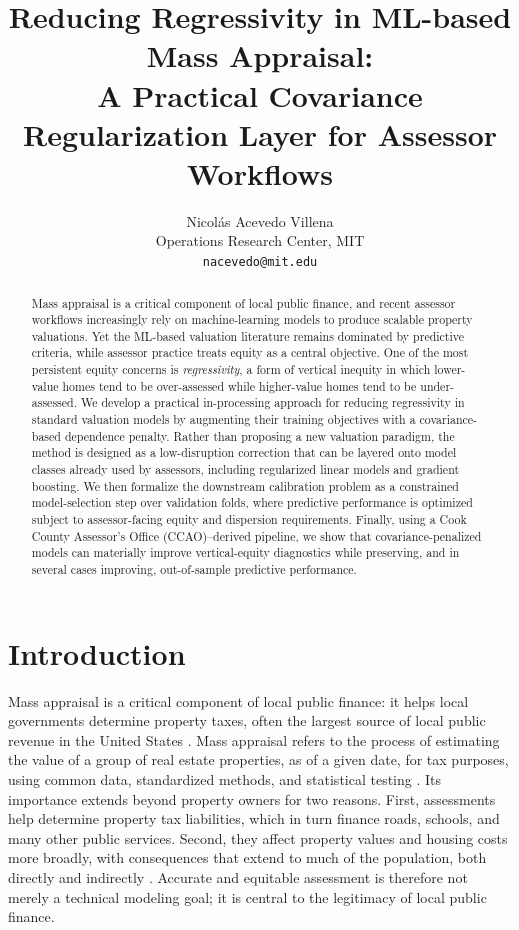\documentclass[12pt]{article}
\title{\vspace{-4mm}Reducing Regressivity in ML-based Mass Appraisal:\\
A Practical Covariance Regularization Layer for Assessor Workflows\vspace{-1mm}}
\author{
Nicol\'as Acevedo Villena\\
{\small Operations Research Center, MIT}\\
{\small \texttt{nacevedo@mit.edu}}
}
\date{\vspace{-8mm}}
\theoremstyle{plain}
\theoremstyle{definition}
\begin{document}
\maketitle

\begin{abstract}
Mass appraisal is a critical component of local public finance, and recent assessor workflows increasingly rely on machine-learning models to produce scalable property valuations. Yet the ML-based valuation literature remains dominated by predictive criteria, while assessor practice treats equity as a central objective. One of the most persistent equity concerns is \emph{regressivity}, a form of vertical inequity in which lower-value homes tend to be over-assessed while higher-value homes tend to be under-assessed. We develop a practical in-processing approach for reducing regressivity in standard valuation models by augmenting their training objectives with a covariance-based dependence penalty. Rather than proposing a new valuation paradigm, the method is designed as a low-disruption correction that can be layered onto model classes already used by assessors, including regularized linear models and gradient boosting. We then formalize the downstream calibration problem as a constrained model-selection step over validation folds, where predictive performance is optimized subject to assessor-facing equity and dispersion requirements. Finally, using a Cook County Assessor's Office (CCAO)--derived pipeline, we show that covariance-penalized models can materially improve vertical-equity diagnostics while preserving, and in several cases improving, out-of-sample predictive performance. 

\end{abstract}

\section{Introduction}

Mass appraisal is a critical component of local public finance: it helps local governments determine property taxes, often the largest source of local public revenue in the United States \cite{Berry2021}. Mass appraisal refers to the process of estimating the value of a group of real estate properties, as of a given date, for tax purposes, using common data, standardized methods, and statistical testing \cite{IAAO2025Mass}. Its importance extends beyond property owners for two reasons. First, assessments help determine property tax liabilities, which in turn finance roads, schools, and many other public services. Second, they affect property values and housing costs more broadly, with consequences that extend to much of the population, both directly and indirectly \cite{Berry2021,Rootetal2023}. Accurate and equitable assessment is therefore not merely a technical modeling goal; it is central to the legitimacy of local public finance.
\end{document}
